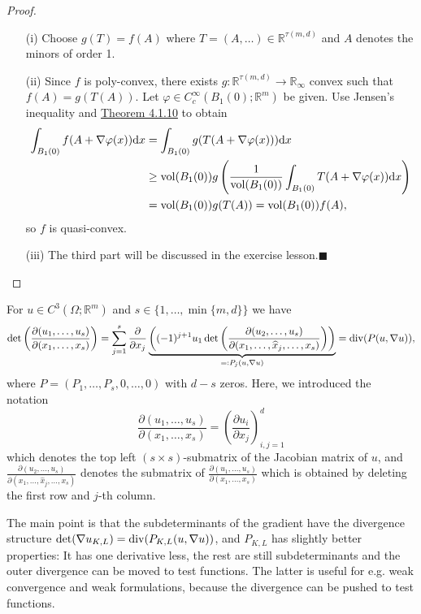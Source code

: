 \begin{proof}
\begin{itemize}
	\item[(i)] Choose $g(T)=f(A)$ where $T=(A,\dotsc)\in\mathbb{R}^{\tau(m,d)}$ and $A$ denotes the minors of order 1.
	\item[(ii)] Since $f$ is poly-convex, there exists $g:\mathbb{R}^{\tau(m,d)}\longrightarrow\mathbb{R}_\infty$ convex such that $f(A)=g(T(A))$. Let $\varphi\in C_c^\infty(B_1(0);\mathbb{R}^m)$ be given. Use Jensen's inequality and \hyperlink{theorem_4_1_10}{Theorem 4.1.10} to obtain
	\begin{align*}
		\int_{B_1(0)}{f(A+\nabla\varphi(x))\mathrm{d}x}&=\int_{B_1(0)}{g(T(A+\nabla\varphi(x)))\mathrm{d}x}\\
		&\geq\operatorname{vol}\mathopen{}\left(B_1(0)\right)\mathclose{}g\left(\frac{1}{\operatorname{vol}\mathopen{}\left(B_1(0)\right)\mathclose{}}\int_{B_1(0)}{T(A+\nabla\varphi(x))\mathrm{d}x}\right)\\
		&=\operatorname{vol}\mathopen{}\left(B_1(0)\right)\mathclose{}g(T(A))=\operatorname{vol}\mathopen{}\left(B_1(0)\right)\mathclose{}f(A),
	\end{align*}
	so $f$ is quasi-convex.
	\item[(iii)] The third part will be discussed in the exercise lesson.\hfill$\blacksquare$\\[11pt]
\end{itemize}
\end{proof}

\begin{lemma}
\label{lem:MinorsAsDivergence}
For $u\in C^3(\Omega;\mathbb{R}^m)$ and $s\in\{1,\dotsc,\min\{m,d\}\}$ we have
\[\det\left(\frac{\partial(u_1,\dotsc,u_s)}{\partial(x_1,\dotsc,x_s)}\right)=\sum_{j=1}^s{\frac{\partial}{\partial x_j}\underbrace{\left((-1)^{j+1}u_1\det\left(\frac{\partial(u_2,\dotsc,u_s)}{\partial(x_1,\dotsc,\widehat{x}_j,\dotsc,x_s)}\right)\right)}_{=:P_j(u,\nabla u)}}=\operatorname{div}\mathopen{}\left(P(u,\nabla u)\right)\mathclose{},\]
where $P=(P_1,\dotsc,P_s,0,\dotsc,0)$ with $d-s$ zeros. Here, we introduced the notation
\[\frac{\partial(u_1,\dotsc,u_s)}{\partial(x_1,\dotsc,x_s)}=\left(\frac{\partial u_i}{\partial x_j}\right)_{i,j=1}^d\]
which denotes the top left $(s\times s)$-submatrix of the Jacobian matrix of $u$, and $\frac{\partial(u_2,\dotsc,u_s)}{\partial(x_1,\dotsc,\widehat{x}_j,\dotsc,x_s)}$ denotes the submatrix of $\frac{\partial(u_1,\dotsc,u_s)}{\partial(x_1,\dotsc,x_s)}$ which is obtained by deleting the first row and $j$-th column.
\end{lemma}


\begin{remark}
The main point is that the subdeterminants of the gradient have the divergence structure $\det(\nabla u_{K,L})=\operatorname{div}\mathopen{}\left(P_{K,L}(u,\nabla u)\right)\mathclose{}$, and $P_{K,L}$ has slightly better properties: It has one derivative less, the rest are still subdeterminants and the outer divergence can be moved to test functions. The latter is useful for e.g. weak convergence and weak formulations, because the divergence can be pushed to test functions.
\end{remark}

